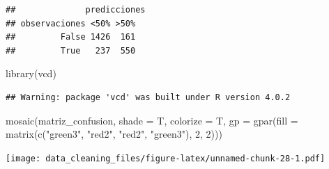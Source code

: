 \documentclass[
]{article}
\newenvironment{Shaded}{\begin{snugshade}}{\end{snugshade}}
\newcommand{\DataTypeTok}[1]{\textcolor[rgb]{0.87,0.87,0.75}{#1}}
\newcommand{\DecValTok}[1]{\textcolor[rgb]{0.86,0.86,0.80}{#1}}
\newcommand{\FloatTok}[1]{\textcolor[rgb]{0.75,0.75,0.82}{#1}}
\newcommand{\KeywordTok}[1]{\textcolor[rgb]{0.94,0.87,0.69}{#1}}
\newcommand{\NormalTok}[1]{\textcolor[rgb]{0.80,0.80,0.80}{#1}}
\newcommand{\OperatorTok}[1]{\textcolor[rgb]{0.94,0.94,0.82}{#1}}
\newcommand{\StringTok}[1]{\textcolor[rgb]{0.80,0.58,0.58}{#1}}
\begin{document}
\begin{Shaded}
\end{Shaded}

\begin{verbatim}
##              predicciones
## observaciones <50% >50%
##         False 1426  161
##         True   237  550
\end{verbatim}

\begin{Shaded}
\begin{Highlighting}[]
\KeywordTok{library}\NormalTok{(vcd)}
\end{Highlighting}
\end{Shaded}

\begin{verbatim}
## Warning: package 'vcd' was built under R version 4.0.2
\end{verbatim}

\begin{Shaded}
\begin{Highlighting}[]
\KeywordTok{mosaic}\NormalTok{(matriz\_confusion, }\DataTypeTok{shade =}\NormalTok{ T, }\DataTypeTok{colorize =}\NormalTok{ T,}
       \DataTypeTok{gp =} \KeywordTok{gpar}\NormalTok{(}\DataTypeTok{fill =} \KeywordTok{matrix}\NormalTok{(}\KeywordTok{c}\NormalTok{(}\StringTok{"green3"}\NormalTok{, }\StringTok{"red2"}\NormalTok{, }\StringTok{"red2"}\NormalTok{, }\StringTok{"green3"}\NormalTok{), }\DecValTok{2}\NormalTok{, }\DecValTok{2}\NormalTok{)))}
\end{Highlighting}
\end{Shaded}

\texttt{[image: data\_cleaning\_files/figure-latex/unnamed-chunk-28-1.pdf]}
\end{document}
